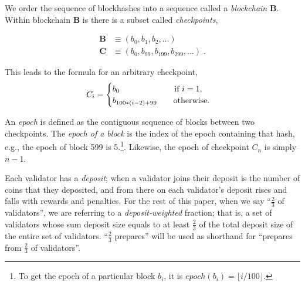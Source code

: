 \documentclass[12pt]{article}
\begin{document}
We order the sequence of blockhashes into a sequence called a \emph{blockchain} $\mathbf{B}$.  Within blockchain $\mathbf{B}$ is there is a subset called \emph{checkpoints},

\begin{equation}
\begin{split}
    \mathbf{B} &\equiv \left( b_0, b_1, b_2, \ldots \right) \\
    \mathbf{C} &\equiv \left( b_0, b_{99}, b_{199}, b_{299}, \ldots \right) \; .
\end{split}
\end{equation}

This leads to the formula for an arbitrary checkpoint,
\begin{equation}
    C_i = \begin{cases}
     b_0 \qquad \qquad \qquad\ \  \textnormal{if } i = 1, \\
     b_{ 100*(i-2) + 99 } \qquad \textnormal{otherwise.}
     \end{cases}
\end{equation}


An \emph{epoch} is defined as the contiguous sequence of blocks between two checkpoints.  The \textit{epoch of a block} is the index of the epoch containing that hash, e.g., the epoch of block 599 is 5.\footnote{To get the epoch of a particular block $b_i$, it is $epoch(b_i) = \lfloor i / 100 \rfloor$.}. Likewise, the epoch of checkpoint $C_n$ is simply $n - 1$.



Each validator has a \emph{deposit}; when a validator joins their deposit is the number of coins that they deposited, and from there on each validator's deposit rises and falls with rewards and penalties. For the rest of this paper, when we say ``$\frac{2}{3}$ of validators'', we are referring to a \emph{deposit-weighted} fraction; that is, a set of validators whose sum deposit size equals to at least $\frac{2}{3}$ of the total deposit size of the entire set of validators. ``$\frac{2}{3}$ prepares'' will be used as shorthand for ``prepares from $\frac{2}{3}$ of validators''.
\end{document}
